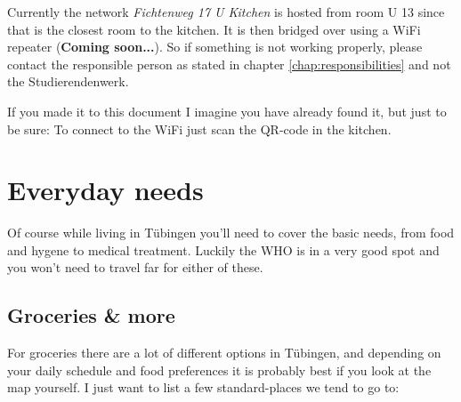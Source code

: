 Currently the network \textit{Fichtenweg 17 U Kitchen} is hosted from room U 13 since that is the closest room to the kitchen. It is then bridged over using a WiFi repeater (\textbf{Coming soon...}). So if something is not working properly, please contact the responsible person as stated in chapter \ref{chap:responsibilities} and not the Studierendenwerk.

If you made it to this document I imagine you have already found it, but just to be sure: To connect to the WiFi just scan the QR-code in the kitchen.

\section{Everyday needs}
Of course while living in Tübingen you'll need to cover the basic needs, from food and hygene to medical treatment. Luckily the WHO is in a very good spot and you won't need to travel far for either of these.  

\subsection{Groceries \& more}
For groceries there are a lot of different options in Tübingen, and depending on your daily schedule and food preferences it is probably best if you look at the map yourself. I just want to list a few standard-places we tend to go to:

